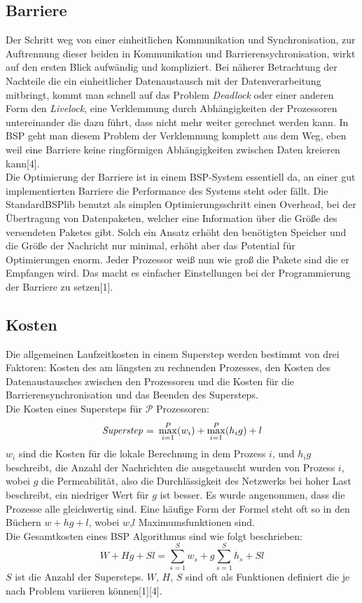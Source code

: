 \documentclass[a4paper,10pt]{scrartcl}
\begin{document}
\subsection{Barriere}
Der Schritt weg von einer einheitlichen Kommunikation und Synchronisation, zur Auftrennung dieser beiden in Kommunikation und Barrierensychronisation, wirkt auf den ersten Blick aufwändig und kompliziert. Bei näherer Betrachtung der Nachteile die ein einheitlicher Datenaustausch mit der Datenverarbeitung mitbringt, kommt man schnell auf das Problem \textit{Deadlock} oder einer anderen Form den \textit{Livelock}, eine Verklemmung durch Abhängigkeiten der Prozessoren untereinander die dazu führt, dass nicht mehr weiter gerechnet werden kann. In BSP geht man diesem Problem der Verklemmung komplett aus dem Weg, eben weil eine Barriere keine ringförmigen Abhängigkeiten zwischen Daten kreieren kann[4].\\
Die Optimierung der Barriere ist in einem BSP-System essentiell da, an einer gut implementierten Barriere die Performance des Systems steht oder fällt. Die StandardBSPlib benutzt als simplen Optimierungsschritt einen Overhead, bei der Übertragung von Datenpaketen, welcher eine Information über die Größe des versendeten Paketes gibt. Solch ein Ansatz erhöht den benötigten Speicher und die Größe der Nachricht nur minimal, erhöht aber das Potential für Optimierungen enorm. Jeder Prozessor weiß nun wie groß die Pakete sind die er Empfangen wird. Das macht es einfacher Einstellungen bei der Programmierung der Barriere zu setzen[1].

\subsection{Kosten}
Die allgemeinen Laufzeitkosten in einem Superstep werden bestimmt von drei Faktoren: Kosten des am längsten zu rechnenden Prozesses, den Kosten des Datenaustausches zwischen den Prozessoren und die Kosten für die Barrierensynchronisation und das Beenden des Supersteps.\\

Die Kosten eines Supersteps für \begin{math}\mathcal{P} \end{math} Prozessoren:\\
\[\mbox{\textit{Superstep} = }\max_{i=1}^P (w_i) + \max_{i=1}^P (h_i g) + l\] 
$w_i$ sind die Kosten für die lokale Berechnung in dem Prozess $i$, und $h_ig$ beschreibt, die Anzahl der Nachrichten die ausgetauscht wurden von Prozess $i$, wobei $g$ die Permeabilität, also die Durchlässigkeit des Netzwerks bei hoher Last beschreibt, ein niedriger Wert für $g$ ist besser. Es wurde angenommen, dass die Prozesse alle gleichwertig sind. Eine häufige Form der Formel steht oft so in den Büchern $w + hg + l$, wobei $w$,$l$ Maximumsfunktionen sind.\\
Die Gesamtkosten eines BSP Algorithmus sind wie folgt beschrieben:\\
\[W + Hg + Sl = \sum\limits_{s=1}^S w_s + g \sum\limits_{s=1}^S h_s + Sl \]
$S$ ist die Anzahl der Supersteps. $W$, $H$, $S$ sind oft als Funktionen definiert die je nach Problem variieren können[1][4]. 
\end{document}
